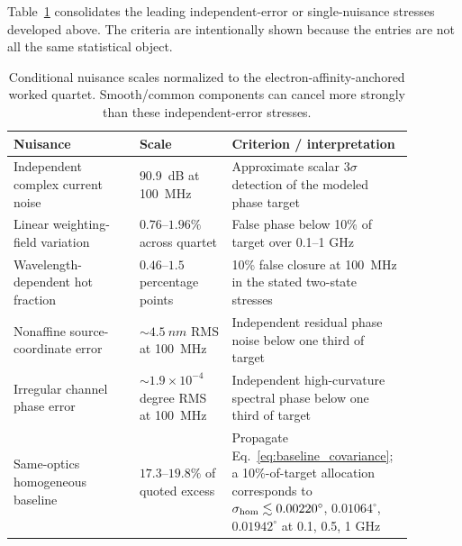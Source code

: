 \documentclass[11pt]{article}
\begin{document}
Table~\ref{tab:nuisance_budget} consolidates the leading independent-error or single-nuisance stresses developed above. The criteria are intentionally shown because the entries are not all the same statistical object.
\begin{table}[H]
\centering
\caption{Conditional nuisance scales normalized to the electron-affinity-anchored worked quartet. Smooth/common components can cancel more strongly than these independent-error stresses.}
\label{tab:nuisance_budget}
\begin{tabular}{p{0.30\linewidth}p{0.22\linewidth}p{0.36\linewidth}}
\toprule
Nuisance & Scale & Criterion / interpretation \\
\midrule
Independent complex current noise & \SI{90.9}{dB} at \SI{100}{MHz} & Approximate scalar $3\sigma$ detection of the modeled phase target \\
Linear weighting-field variation & $0.76$--$1.96\%$ across quartet & False phase below 10\% of target over 0.1--1 GHz \\
Wavelength-dependent hot fraction & $0.46$--$1.5$ percentage points & 10\% false closure at \SI{100}{MHz} in the stated two-state stresses \\
Nonaffine source-coordinate error & $\sim4.5~\si{nm}$ RMS at \SI{100}{MHz} & Independent residual phase noise below one third of target \\
Irregular channel phase error & $\sim1.9\times10^{-4}$ degree RMS at \SI{100}{MHz} & Independent high-curvature spectral phase below one third of target \\
Same-optics homogeneous baseline & $17.3$--$19.8\%$ of quoted excess & Propagate Eq.~\eqref{eq:baseline_covariance}; a 10\%-of-target allocation corresponds to $\sigma_{\rm hom}\lesssim0.00220^\circ$, $0.01064^\circ$, $0.01942^\circ$ at 0.1, 0.5, 1 GHz \\
\bottomrule
\end{tabular}
\end{table}
\end{document}
